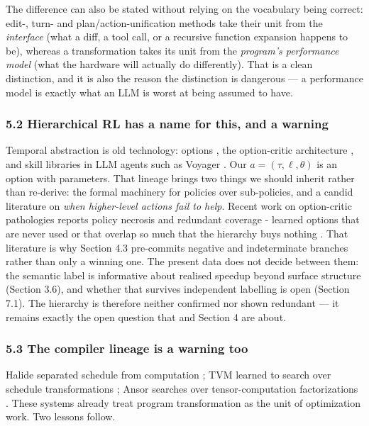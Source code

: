 \documentclass[
  11pt,
]{article}
\begin{document}
The difference can also be stated without relying on the vocabulary being correct: edit-, turn- and plan/action-unification methods take their unit from the \emph{interface} (what a diff, a tool call, or a recursive function expansion happens to be), whereas a transformation takes its unit from the \emph{program's performance model} (what the hardware will actually do differently). That is a clean distinction, and it is also the reason the distinction is dangerous --- a performance model is exactly what an LLM is worst at being assumed to have.

\hypertarget{hierarchical-rl-has-a-name-for-this-and-a-warning}{%
\subsubsection{5.2 Hierarchical RL has a name for this, and a warning}\label{hierarchical-rl-has-a-name-for-this-and-a-warning}}

Temporal abstraction is old technology: options \cite{between11}, the option-critic architecture \cite{the12}, and skill libraries in LLM agents such as Voyager \cite{voyager14}. Our \(a = (\tau, \ell, \theta)\) is an option with parameters. That lineage brings two things we should inherit rather than re-derive: the formal machinery for policies over sub-policies, and a candid literature on \emph{when higher-level actions fail to help}. Recent work on option-critic pathologies reports policy necrosis and redundant coverage - learned options that are never used or that overlap so much that the hierarchy buys nothing \cite{when13}. That literature is why Section 4.3 pre-commits negative and indeterminate branches rather than only a winning one. The present data does not decide between them: the semantic label is informative about realised speedup beyond surface structure (Section 3.6), and whether that survives independent labelling is open (Section 7.1). The hierarchy is therefore neither confirmed nor shown redundant --- it remains exactly the open question that \cite{when13} and Section 4 are about.

\hypertarget{the-compiler-lineage-is-a-warning-too}{%
\subsubsection{5.3 The compiler lineage is a warning too}\label{the-compiler-lineage-is-a-warning-too}}

Halide separated schedule from computation \cite{halide8}; TVM learned to search over schedule transformations \cite{tvm9}; Ansor searches over tensor-computation factorizations \cite{ansor10}. These systems already treat program transformation as the unit of optimization work. Two lessons follow.
\end{document}
